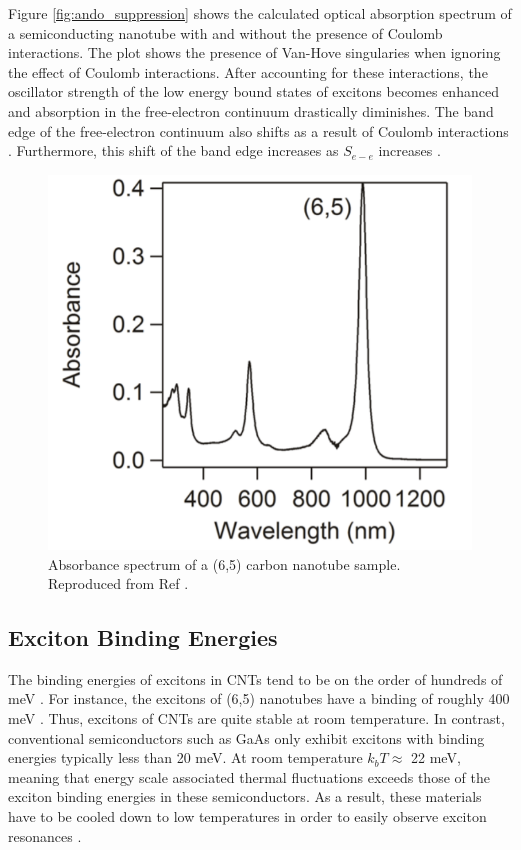 Figure \ref{fig:ando_suppression} shows the calculated optical absorption spectrum of a semiconducting nanotube with and without the presence of Coulomb interactions. The plot shows the presence of Van-Hove singularies when ignoring the effect of Coulomb interactions. After accounting for these interactions, the oscillator strength of the low energy bound states of excitons becomes enhanced and absorption in the free-electron continuum drastically diminishes. The band edge of the free-electron continuum also shifts as a result of Coulomb interactions \cite{ando1997excitons}. Furthermore, this shift of the band edge increases as $S_{e-e}$ increases \cite{ando2005theory}. 

\begin{figure}[H]
	\centering
	\includegraphics[scale=0.62]{images/chapter_optical_props/cnt_absorbance_yota}
	\caption{Absorbance spectrum of a (6,5) carbon nanotube sample. Reproduced from Ref \cite{ichinose2017extraction}. }
\end{figure}

\subsection{Exciton Binding Energies}

The binding energies of excitons in CNTs tend to be on the order of hundreds of meV \cite{wang2005optical}. For instance, the excitons of (6,5) nanotubes have a binding of roughly 400 meV \cite{wang2005optical}. Thus, excitons of CNTs are quite stable at room temperature. In contrast, conventional semiconductors such as GaAs only exhibit excitons with binding energies typically less than 20 meV. At room temperature $k_b T \approx$ 22 meV, meaning that energy scale associated thermal fluctuations exceeds those of the exciton binding energies in these semiconductors. As a result, these materials have to be cooled down to low temperatures in order to easily observe exciton resonances \cite{liang1970excitons}. 

